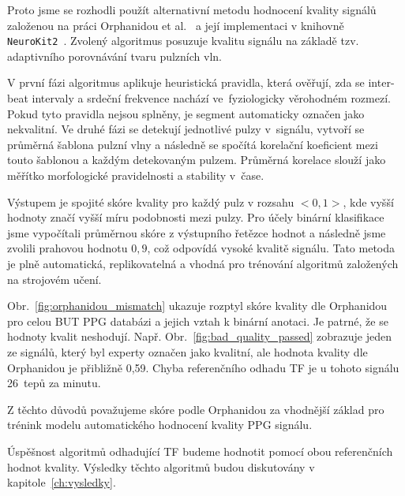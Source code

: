Proto jsme se rozhodli použít alternativní metodu hodnocení kvality signálů založenou na práci Orphanidou et al.~\cite{Orphanidou2015} a její implementaci v knihovně \texttt{NeuroKit2}~\cite{NeuroKit2}.
Zvolený algoritmus posuzuje kvalitu signálu na základě tzv. adaptivního porovnávání tvaru pulzních vln.

V první fázi algoritmus aplikuje heuristická pravidla, která ověřují, zda se inter-beat intervaly a srdeční frekvence nachází ve~fyziologicky věrohodném rozmezí.
Pokud tyto pravidla nejsou splněny, je segment automaticky označen jako nekvalitní.
Ve druhé fázi se detekují jednotlivé pulzy v~signálu, vytvoří se průměrná šablona pulzní vlny a následně se spočítá korelační koeficient mezi touto šablonou a každým detekovaným pulzem.
Průměrná korelace slouží jako měřítko morfologické pravidelnosti a stability v~čase.

Výstupem je spojité skóre kvality pro každý pulz v rozsahu $<0,1>$, kde vyšší hodnoty značí vyšší míru podobnosti mezi pulzy.
Pro účely binární klasifikace jsme vypočítali průměrnou skóre z výstupního řetězce hodnot a následně jsme zvolili prahovou hodnotu $0,9$, což odpovídá vysoké kvalitě signálu.
Tato metoda je plně automatická, replikovatelná a vhodná pro trénování algoritmů založených na strojovém učení.

Obr.~\ref{fig:orphanidou_mismatch} ukazuje rozptyl skóre kvality dle Orphanidou pro celou \acs{BUT PPG} databázi a jejich vztah k binární anotaci.
Je patrné, že se hodnoty kvalit neshodují.
Např. Obr.~\ref{fig:bad_quality_passed} zobrazuje jeden ze signálů, který byl experty označen jako kvalitní, ale hodnota kvality dle Orphanidou je přibližně 0,59.
Chyba referenčního odhadu \acs{TF} je u tohoto signálu 26~tepů za minutu.

Z těchto důvodů považujeme skóre podle Orphanidou za vhodnější základ pro trénink modelu automatického hodnocení kvality PPG signálu.

Úspěšnost algoritmů odhadující \acs{TF} budeme hodnotit pomocí obou referenčních hodnot kvality.
Výsledky těchto algoritmů budou diskutovány v kapitole~\ref{ch:vysledky}.


